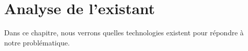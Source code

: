 \chapter{Analyse de l'existant}

Dans ce chapitre, nous verrons quelles technologies existent pour répondre à notre problématique.
 